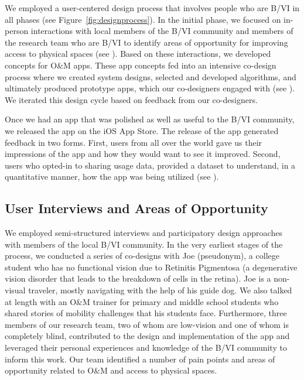 \documentclass[chi_draft]{sigchi}
\newcommand{\BVI}{B/VI\xspace}
\newcommand{\OM}{O\&M\xspace}
\begin{document}
We employed a user-centered design process that involves people who are \BVI in all phases (see Figure~\ref{fig:designprocess}).  In the initial phase, we focused on in-person interactions with local members of the \BVI community and members of the research team who are \BVI to identify areas of opportunity for improving access to physical spaces (see \emph{}).  Based on these interactions, we developed concepts for \OM apps.  These app concepts fed into an intensive co-design process where we created system designs, selected and developed algorithms, and ultimately produced prototype apps, which our co-designers engaged with (see \emph{}).  We iterated this design cycle based on feedback from our co-designers.

Once we had an app that was polished as well as useful to the \BVI community, we released the app on the iOS App Store.  The release of the app generated feedback in two forms.  First, users from all over the world gave us their impressions of the app and how they would want to see it improved.  Second, users who opted-in to sharing usage data, provided a dataset to understand, in a quantitative manner, how the app was being utilized (see \emph{}).

\subsection{User Interviews and Areas of Opportunity}\label{sec:areasofopportunity}
We employed semi-structured interviews and participatory design approaches \cite{buhler2001empowered, schuler1993participatory} with members of the local \BVI community.  In the very earliest stages of the process, we conducted a series of co-designs with Joe (pseudonym), a college student who has no functional vision due to Retinitis Pigmentosa (a degenerative vision disorder that leads to the breakdown of cells in the retina).  Joe is a non-visual traveler, mostly navigating with the help of his guide dog. We also talked at length with an \OM trainer for primary and middle school students who shared stories of mobility challenges that his students face. Furthermore, three members of our research team, two of whom are low-vision and one of whom is completely blind, contributed to the design and implementation of the app and leveraged their personal experiences and knowledge of the \BVI community to inform this work.  Our team identified a number of pain points and areas of opportunity related to \OM and access to physical spaces.
\end{document}
